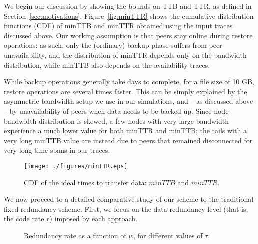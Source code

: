 We begin our discussion by showing the bounds on TTB and TTR, as
defined in Section~\ref{sec:motivations}. Figure~\vref{fig:minTTR} shows
the cumulative distribution functions (CDF) of minTTB and minTTR
obtained using the input traces discussed above. Our working
assumption is that peers stay online during restore operations: as
such, only the (ordinary) backup phase suffers from peer
unavailability, and the distribution of minTTR depends only on the
bandwidth distribution, while minTTB also depends on the availability
traces.

While backup operations generally take days to complete, for a file
size of 10 GB, restore operations are several times faster. This can
be simply explained by the asymmetric bandwidth setup we use in our
simulations, and -- as discussed above -- by unavailability of peers
when data needs to be backed up. Since node bandwidth distribution is
skewed, a few nodes with very large bandwidth experience a much lower
value for both minTTR and minTTB; the tails with a very long minTTB
value are instead due to peers that remained disconnected for very
long time spans in our traces.

\begin{figure}
\centering
\texttt{[image: ./figures/minTTR.eps]}
\caption{CDF of the ideal times to transfer data: $minTTB$ and $minTTR$.}
\label{fig:minTTR}
\end{figure}

We now proceed to a detailed comparative study of our scheme to the traditional fixed-redundancy scheme. 
First, we focus on the data redundancy
level (that is, the code rate $r$) imposed by each approach.
\begin{figure}[bp]
  \centering
 \caption{Redundancy rate as a function of $w$, for different values of $\tau$.}
 \label{fig:redundancy}
\end{figure}
 

